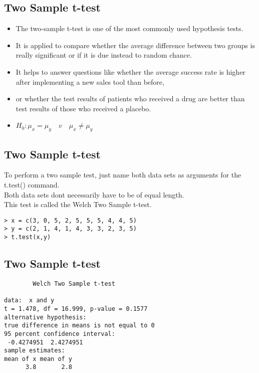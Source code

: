 \documentclass[a4paper,12pt]{article}
\begin{document}
\subsection{Two Sample t-test}
\begin{itemize}
\item The two-sample t-test is one of the most commonly used
hypothesis tests. \item It is applied to compare whether the
average difference between two groups is really significant or if
it is due instead to random chance. \item It helps to answer
questions like whether the average success rate is higher after
implementing a new sales tool than before, \item or whether the
test results of patients who received a drug are better than test
results of those who received a placebo.
\item
$H_{0}: \mu_{x} = \mu_{y} \quad v \quad \mu_{x} \neq \mu_{y}$\\
\end{itemize}

\subsection{Two Sample t-test}

To perform a two sample test, just name both data sets as arguments for the t.test()
command. \\ Both data sets dont necessarily have to be of equal length. \\ This test is called the Welch Two Sample t-test.
\begin{verbatim}
> x = c(3, 0, 5, 2, 5, 5, 5, 4, 4, 5)
> y = c(2, 1, 4, 1, 4, 3, 3, 2, 3, 5)
> t.test(x,y)
\end{verbatim}
\subsection{Two Sample t-test}
\begin{verbatim}
        Welch Two Sample t-test

data:  x and y
t = 1.478, df = 16.999, p-value = 0.1577
alternative hypothesis:
true difference in means is not equal to 0
95 percent confidence interval:
 -0.4274951  2.4274951
sample estimates:
mean of x mean of y
      3.8       2.8
\end{verbatim}
\end{document}
